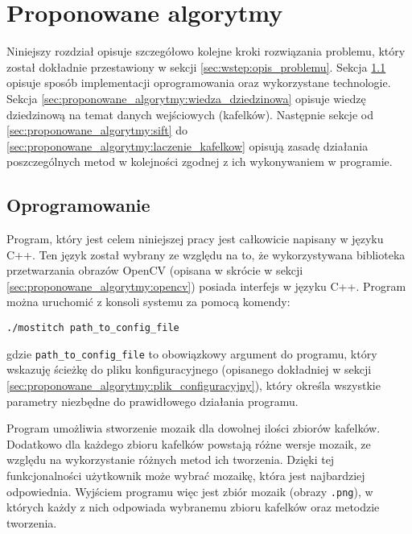 %
\chapter{Proponowane algorytmy}
\label{sec:proponowane_algorytmy}

Niniejszy rozdział opisuje szczegółowo kolejne kroki rozwiązania problemu, który został dokładnie przestawiony w sekcji \ref{sec:wstep:opis_problemu}. Sekcja \ref{sec:proponowane_algorytmy:oprogramowanie} opisuje sposób implementacji oprogramowania oraz wykorzystane technologie. Sekcja \ref{sec:proponowane_algorytmy:wiedza_dziedzinowa} opisuje wiedzę dziedzinową na temat danych wejściowych (kafelków). Następnie sekcje od \ref{sec:proponowane_algorytmy:sift} do \ref{sec:proponowane_algorytmy:laczenie_kafelkow} opisują zasadę działania poszczególnych metod w kolejności zgodnej z ich wykonywaniem w programie.

\section{Oprogramowanie}
\label{sec:proponowane_algorytmy:oprogramowanie}

Program, który jest celem niniejszej pracy jest całkowicie napisany w języku C++. Ten język został wybrany ze względu na to, że wykorzystywana biblioteka przetwarzania obrazów OpenCV (opisana w skrócie w sekcji \ref{sec:proponowane_algorytmy:opencv}) posiada interfejs w języku C++. Program można uruchomić z konsoli systemu za pomocą komendy:

\begin{verbatim}
./mostitch path_to_config_file
\end{verbatim}

gdzie \texttt{path\_to\_config\_file} to obowiązkowy argument do programu, który wskazuję ścieżkę do pliku konfiguracyjnego (opisanego dokładniej w sekcji \ref{sec:proponowane_algorytmy:plik_configuracyjny}), który określa wszystkie parametry niezbędne do prawidłowego działania programu.

Program umożliwia stworzenie mozaik dla dowolnej ilości zbiorów kafelków. Dodatkowo dla każdego zbioru kafelków powstają różne wersje mozaik, ze względu na wykorzystanie różnych metod ich tworzenia. Dzięki tej funkcjonalności użytkownik może wybrać mozaikę, która jest najbardziej odpowiednia. Wyjściem programu więc jest zbiór mozaik (obrazy \texttt{.png}), w których każdy z nich odpowiada wybranemu zbioru kafelków oraz metodzie tworzenia.

